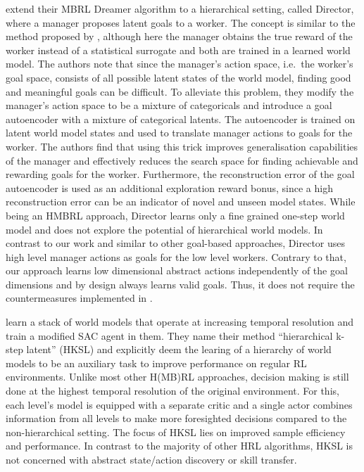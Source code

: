 \documentclass{article}
\begin{document}
\cite{hafner2022deep} extend their MBRL Dreamer \citep{hafner2022mastering} algorithm to a hierarchical setting, called Director, where a manager proposes latent goals to a worker. The concept is similar to the method proposed by \citet{vezhnevets2017feudal}, although here the manager obtains the true reward of the worker instead of a statistical surrogate and both are trained in a learned world model. The authors note that since the manager's action space, i.e.\ the worker's goal space, consists of all possible latent states of the world model, finding good and meaningful goals can be difficult. To alleviate this problem, they modify the manager's action space to be a mixture of categoricals and introduce a goal autoencoder with a mixture of categorical latents. The autoencoder is trained on latent world model states and used to translate manager actions to goals for the worker. The authors find that using this trick improves generalisation capabilities of the manager and effectively reduces the search space for finding achievable and rewarding goals for the worker. Furthermore, the reconstruction error of the goal autoencoder is used as an additional exploration reward bonus, since a high reconstruction error can be an indicator of novel and unseen model states.
While being an HMBRL approach, Director learns only a fine grained one-step world model and does not explore the potential of hierarchical world models. In contrast to our work and similar to other goal-based approaches, Director uses high level manager actions as goals for the low level workers. Contrary to that, our approach learns low dimensional abstract actions independently of the goal dimensions and by design always learns valid goals. Thus, it does not require the countermeasures implemented in \citep{hafner2022deep}.

\citet{mcinroe2023learning} learn a stack of world models that operate at increasing temporal resolution and train a modified SAC \citep{haarnoja2018soft} agent in them.
They name their method ``hierarchical k-step latent'' (HKSL) and explicitly deem the learing of a hierarchy of world models to be an auxiliary task to improve performance on regular RL environments.
Unlike most other H(MB)RL approaches, decision making is still done at the highest temporal resolution of the original environment.
For this, each level's model is equipped with a separate critic and a single actor combines information from all levels to make more foresighted decisions compared to the non-hierarchical setting.
The focus of HKSL lies on improved sample efficiency and performance. In contrast to the majority of other HRL algorithms, HKSL is not concerned with abstract state/action discovery or skill transfer.
\end{document}
